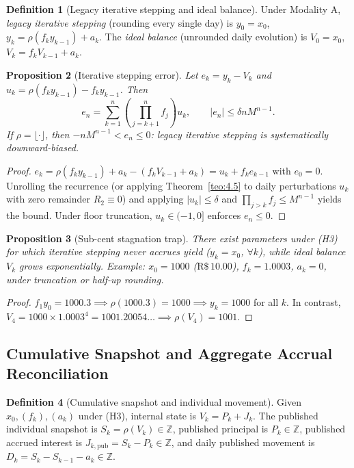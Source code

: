 \documentclass[11pt, a4paper]{article}
\theoremstyle{definition}
\newtheorem{definicao}{Definition}[section]
\theoremstyle{plain}
\newtheorem{proposicao}[definicao]{Proposition}
\theoremstyle{remark}
\begin{document}
\begin{definicao}[Legacy iterative stepping and ideal balance]\label{def:5.4}
Under Modality A, \emph{legacy iterative stepping} (rounding every single day) is $y_0 = x_0$, $y_k = \rho(f_k y_{k-1}) + a_k$. The \emph{ideal balance} (unrounded daily evolution) is $V_0 = x_0$, $V_k = f_k V_{k-1} + a_k$.
\end{definicao}

\begin{proposicao}[Iterative stepping error]\label{prop:5.5}
Let $e_k = y_k - V_k$ and $u_k = \rho(f_k y_{k-1}) - f_k y_{k-1}$. Then
\[
e_n = \sum_{k=1}^{n} \left(\prod_{j=k+1}^{n} f_j\right) u_k, \qquad |e_n| \le \delta n M^{n-1}.
\]
If $\rho = \lfloor \cdot \rfloor$, then $-n M^{n-1} < e_n \le 0$: legacy iterative stepping is systematically downward-biased.
\end{proposicao}
\begin{proof}
$e_k = \rho(f_k y_{k-1}) + a_k - (f_k V_{k-1} + a_k) = u_k + f_k e_{k-1}$ with $e_0 = 0$. Unrolling the recurrence (or applying Theorem~\ref{teo:4.5} to daily perturbations $u_k$ with zero remainder $R_2 \equiv 0$) and applying $|u_k| \le \delta$ and $\prod_{j>k} f_j \le M^{n-1}$ yields the bound. Under floor truncation, $u_k \in (-1, 0]$ enforces $e_n \le 0$.
\end{proof}

\begin{proposicao}[Sub-cent stagnation trap]\label{prop:5.6}
There exist parameters under (H3) for which iterative stepping never accrues yield ($y_k = x_0$, $\forall k$), while ideal balance $V_k$ grows exponentially. Example: $x_0 = 1000$ ($\text{R\$}\,10.00$), $f_k = 1.0003$, $a_k = 0$, under truncation or half-up rounding.
\end{proposicao}
\begin{proof}
$f_1 y_0 = 1000.3 \implies \rho(1000.3) = 1000 \implies y_k = 1000$ for all $k$. In contrast, $V_4 = 1000 \times 1.0003^4 = 1001.20054\dots \implies \rho(V_4) = 1001$.
\end{proof}

\subsection{Cumulative Snapshot and Aggregate Accrual Reconciliation}\label{sec:5.3}

\begin{definicao}[Cumulative snapshot and individual movement]\label{def:5.7}
Given $x_0, (f_k), (a_k)$ under (H3), internal state is $V_k = P_k + J_k$. The published individual snapshot is $S_k = \rho(V_k) \in \mathbb{Z}$, published principal is $P_k \in \mathbb{Z}$, published accrued interest is $J_{k,\text{pub}} = S_k - P_k \in \mathbb{Z}$, and daily published movement is $D_k = S_k - S_{k-1} - a_k \in \mathbb{Z}$.
\end{definicao}
\end{document}
